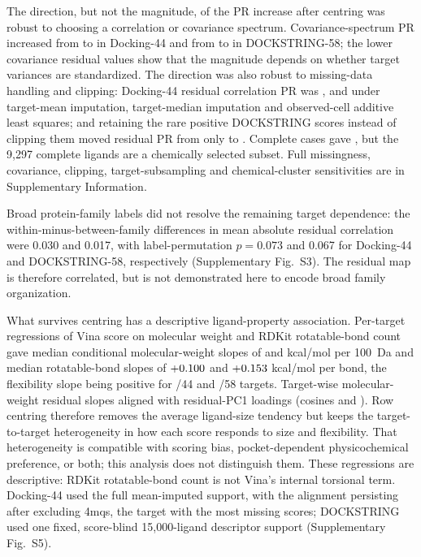 \documentclass[11pt]{article}
\begin{document}
The direction, but not the magnitude, of the PR increase after centring was robust to
choosing a correlation or covariance spectrum. Covariance-spectrum PR increased from
\DffRawCovariancePR{} to \DffResidualCovariancePR{} in Docking-44 and from
\DsRawCovariancePR{} to \DsResidualCovariancePR{} in DOCKSTRING-58; the lower covariance residual values
show that the magnitude depends on whether target variances are standardized. The direction
was also robust to missing-data handling and clipping:
Docking-44 residual correlation PR was \DffResidualPR{}, \DffMedianImputedResidualPR{} and
\DffObservedALSResidualPR{} under target-mean imputation,
target-median imputation and observed-cell additive least squares; and retaining the rare
positive DOCKSTRING scores instead of clipping them moved residual PR from \DsResidualPR{} only to
\DsUnclippedResidualPR{}. Complete cases gave \DffCompleteCaseResidualPR{}, but the 9,297 complete ligands are a chemically selected
subset. Full missingness, covariance, clipping, target-subsampling and chemical-cluster
sensitivities are in Supplementary Information.

Broad protein-family labels did not resolve the remaining target dependence: the
within-minus-between-family differences in mean absolute residual correlation were 0.030 and
0.017, with label-permutation $p=0.073$ and 0.067 for Docking-44 and DOCKSTRING-58,
respectively (Supplementary Fig.~S3). The residual map is therefore correlated, but is not
demonstrated here to encode broad family organization.

What survives centring has a descriptive ligand-property association. Per-target regressions of
Vina score on molecular weight and RDKit rotatable-bond count gave median conditional
molecular-weight slopes of \DffConditionalMWSlope{} and \DsConditionalMWSlope{} kcal/mol per
100~Da and median rotatable-bond slopes of $+0.100{}$ and
$+0.153{}$ kcal/mol per bond, the flexibility slope being positive for
\DffPositiveRotTargets{}/44 and \DsPositiveRotTargets{}/58 targets. Target-wise
molecular-weight residual slopes aligned with residual-PC1 loadings (cosines
\DffMWResidualLoadingCosine{} and \DsMWResidualLoadingCosine{}). Row centring therefore
removes the average ligand-size tendency but keeps the target-to-target heterogeneity in how
each score responds to size and flexibility. That heterogeneity is compatible with scoring
bias, pocket-dependent physicochemical preference, or both; this analysis does not
distinguish them. These regressions are descriptive: RDKit rotatable-bond count is not
Vina's internal torsional term. Docking-44
used the full mean-imputed support, with the alignment persisting after excluding 4mqs, the
target with the most missing scores; DOCKSTRING used one fixed, score-blind 15,000-ligand
descriptor support (Supplementary Fig.~S5).
\end{document}
